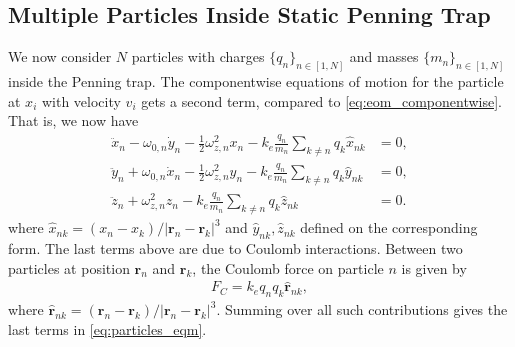 \documentclass[english,notitlepage,reprint]{revtex4-2}  %
\renewcommand{\vec}[1]{\mathbf{#1}}
\begin{document}
\subsection{Multiple Particles Inside Static Penning Trap} \label{sec:multiple_particles}
We now consider \(N\) particles with charges \(\{q_n\}_{n\in[1,N]}\) and masses \(\{m_n\}_{n\in[1,N]}\) inside the Penning trap. The componentwise equations of motion for the particle at \(x_i\) with velocity \(v_i\) gets a second term, compared to \eqref{eq:eom_componentwise}. That is, we now have
\begin{subequations}    \label{eq:particles_eqm}
    \begin{align}
        \ddot{x}_n - \omega_{0,n}\dot{y}_n - \frac{1}{2}\omega_{z,n}^2x_n - k_e \frac{q_n}{m_n}\sum_{k\neq n} q_k \hat{x}_{nk} &= 0, \\
        \ddot{y}_n + \omega_{0,n}\dot{x}_n - \frac{1}{2}\omega_{z,n}^2y_n - k_e \frac{q_n}{m_n}\sum_{k\neq n} q_k \hat{y}_{nk} &= 0, \\ 
        \ddot{z}_n + \omega_{z,n}^2z_n - k_e \frac{q_n}{m_n}\sum_{k\neq n}q_k \hat{z}_{nk} &= 0.
    \end{align}
\end{subequations}
where \(\hat{x}_{nk} = (x_n - x_k)/|\vec{r}_n-\vec{r}_k|^3\) and \(\hat{y}_{nk}, \hat{z}_{nk}\) defined on the corresponding form. The last terms above are due to Coulomb interactions. Between two particles at position \(\vec{r}_n\) and \(\vec{r}_k\), the Coulomb force on particle \(n\) is given by 
\begin{align}
    F_C = k_e q_{n}q_{k}\hat{\vec{r}}_{nk}, \label{eq:colliColliCOULOUMB}
\end{align}
where \(\hat{\vec{r}}_{nk} = (\vec{r}_n - \vec{r}_k)/|\vec{r}_n-\vec{r}_k|^3\). Summing over all such contributions gives the last terms in \eqref{eq:particles_eqm}.

\end{document}
